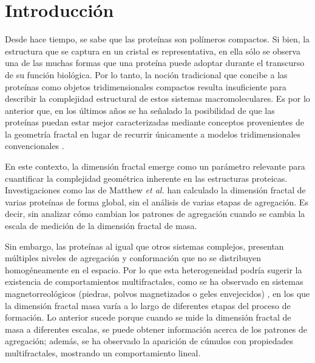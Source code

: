\chapter{Introducción}

Desde hace tiempo, se sabe que las prote\'{i}nas son pol\'{i}meros compactos. Si bien, la estructura que se captura en un cristal es representativa, en ella s\'{o}lo se observa una de las muchas formas que una prote\'{i}na puede adoptar durante el transcurso de su funci\'{o}n biol\'{o}gica. Por lo tanto, la noci\'{o}n tradicional que concibe a las prote\'{i}nas como objetos tridimensionales compactos resulta insuficiente para describir la complejidad estructural de estos sistemas macromoleculares. Es por lo anterior que, en los últimos años se ha señalado la posibilidad de que las prote\'{i}nas puedan estar mejor caracterizadas mediante conceptos provenientes de la geometría fractal en lugar de recurrir únicamente a modelos tridimensionales convencionales \cite{Dewey1997}.

En este contexto, la dimensión fractal emerge como un parámetro relevante para cuantificar la complejidad geométrica inherente en las estructuras proteicas. Investigaciones como las de Matthew \textit{et al.} \cite{Enright2005, Enright2006} han calculado la dimensi\'{o}n fractal de varias prote\'{i}nas de forma global, sin el an\'{a}lisis de varias etapas de agregaci\'{o}n. Es decir, sin analizar c\'{o}mo cambian los patrones de agregaci\'{o}n cuando se cambia la escala de medici\'{o}n de la dimensi\'{o}n fractal de masa.


 Sin embargo, las proteínas al igual que otros sistemas complejos, presentan múltiples niveles de agregación y conformación que no se distribuyen homogéneamente en el espacio. Por lo que esta heterogeneidad podría sugerir la existencia de comportamientos multifractales, como se ha observado en sistemas magnetorreológicos (piedras, polvos magnetizados o geles envejecidos) \cite{Carrillo2003}, en los que la dimensión fractal masa varía a lo largo de diferentes etapas del proceso de formación. Lo anterior sucede porque cuando se mide la dimensi\'{o}n fractal de masa a diferentes escalas, se puede obtener informaci\'{o}n acerca de los patrones de agregaci\'{o}n; adem\'{a}s, se ha observado la aparici\'{o}n de c\'{u}mulos  con propiedades multifractales, mostrando un comportamiento lineal.


